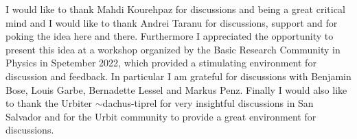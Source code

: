 \begin{acknowledgements}

I would like to thank Mahdi Kourehpaz for discussions and being a great critical mind and I would like to thank Andrei Taranu for discussions, support and for poking the idea here and there. Furthermore I appreciated the opportunity to present this idea at a workshop organized by the Basic Research Community in Physics in Spetember 2022, which provided a stimulating environment for discussion and feedback. In particular I am grateful for discussions with Benjamin Bose, Louis Garbe, Bernadette Lessel and Markus Penz. Finally I would also like to thank the Urbiter $\sim$dachus-tiprel for very insightful discussions in San Salvador and for the Urbit community to provide a great environment for discussions.

\end{acknowledgements}
